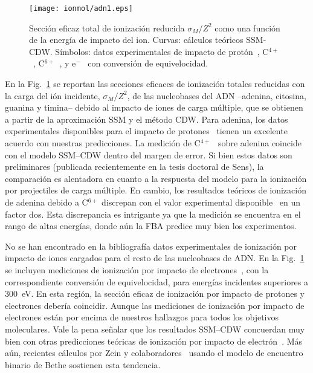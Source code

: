 \begin{figure}
\centering
\texttt{[image: ionmol/adn1.eps]}
\caption[Sección eficaz total de ionización reducida por $Z$ (Parte I).]
{Sección eficaz total de ionización reducida $\sigma_{M}/Z^2$ como 
una función de la energía de impacto del ion. Curvas: cálculos teóricos 
SSM-CDW. Símbolos: datos experimentales de impacto de 
protón~\cite{Iriki:11}, 
C$^{4+}$~\cite{Sens:20}, C$^{6+}$~\cite{Bhattacharjee:19}, y 
e$^-$~\cite{Rahman:16} con conversión de equivelocidad.}
\label{fig:crossDNA_1}
\end{figure} 

En la Fig.~\ref{fig:crossDNA_1} se reportan las secciones eficaces de 
ionización totales reducidas con la carga del ión incidente, 
$\sigma_M/Z^2$, de las nucleobases del ADN --adenina, citosina, guanina 
y timina-- debido al impacto de iones de carga múltiple, que se obtienen 
a partir de la aproximación SSM y el método CDW. Para adenina, los datos 
experimentales disponibles para el impacto de protones~\cite{Iriki:11} 
tienen un excelente acuerdo con nuestras predicciones. La medición de 
C$^{4+}$~\cite{Sens:20} sobre adenina coincide con el modelo SSM--CDW 
dentro del margen de error. Si bien estos datos son preliminares 
(publicada recientemente en la tesis doctoral de Sens), la comparación 
es alentadora en cuanto a la respuesta del modelo para la ionización por 
projectiles de carga múltiple. En cambio, los resultados teóricos de 
ionización de adenina debido a C$^{6+}$ discrepan con el valor 
experimental disponible~\cite{Bhattacharjee:19} en un factor dos. Esta 
discrepancia es intrigante ya que la medición se encuentra en el rango 
de altas energías, donde aún la FBA predice muy bien los experimentos.

No se han encontrado en la bibliografía datos experimentales de 
ionización por impacto de iones cargados para el resto de las 
nucleobases de ADN. En la Fig.~\ref{fig:crossDNA_1} se incluyen 
mediciones de ionización por impacto de electrones~\cite{Rahman:16}, con 
la correspondiente conversión de equivelocidad, para energías incidentes 
superiores a 300~eV. En esta región, la sección eficaz de ionización por 
impacto de protones y electrones debería coincidir. Aunque las 
mediciones de ionización por impacto de electrones están por encima de 
nuestros hallazgos para todos los objetivos moleculares. Vale la pena 
señalar que los resultados SSM--CDW concuerdan muy bien con otras 
predicciones teóricas de ionización por impacto de 
electrón~\cite{mozejko2003,tan2018}. Más aún, recientes cálculos por 
Zein y colaboradores~\cite{Zein:21} usando el modelo de encuentro 
binario de Bethe sostienen esta tendencia.

